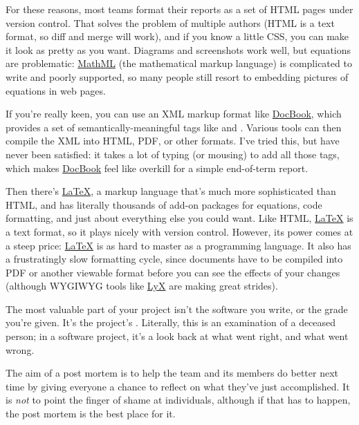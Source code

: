 \documentclass{report}
\begin{document}
For these reasons, most teams format their reports as a set of HTML
pages under version control.  That solves the problem of multiple
authors (HTML is a text format, so diff and merge will work), and if
you know a little CSS, you can make it look as pretty as you want.
Diagrams and screenshots work well, but equations are problematic:
\url{MathML} (the mathematical markup language) is complicated to
write and poorly supported, so many people still resort to embedding
pictures of equations in web pages.

If you're really keen, you can use an XML markup format like
\url{DocBook}, which provides a set of semantically-meaningful tags
like  and .  Various tools can then
compile the XML into HTML, PDF, or other formats.  I've tried this,
but have never been satisfied: it takes a lot of typing (or mousing)
to add all those tags, which makes \url{DocBook} feel like overkill
for a simple end-of-term report.

Then there's \url{LaTeX}, a markup language that's much more
sophisticated than HTML, and has literally thousands of add-on
packages for equations, code formatting, and just about everything
else you could want.  Like HTML, \url{LaTeX} is a text format, so it
plays nicely with version control.  However, its power comes at a
steep price: \url{LaTeX} is as hard to master as a programming
language.  It also has a frustratingly slow formatting cycle, since
documents have to be compiled into PDF or another viewable format
before you can see the effects of your changes (although WYGIWYG tools
like \url{LyX} are making great strides).



The most valuable part of your project isn't the software you write,
or the grade you're given.  It's the project's .
Literally, this is an examination of a deceased person; in a software
project, it's a look back at what went right, and what went wrong.

The aim of a post mortem is to help the team and its members do better
next time by giving everyone a chance to reflect on what they've just
accomplished.  It is \emph{not} to point the finger of shame at
individuals, although if that has to happen, the post mortem is the
best place for it.
\end{document}
